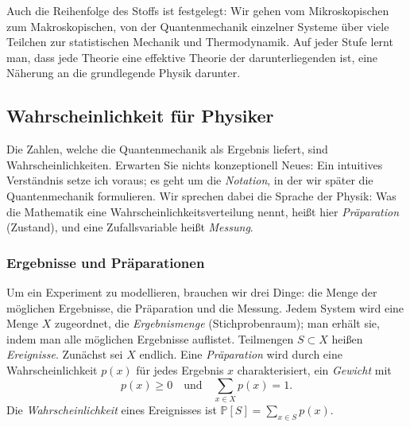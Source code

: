 Auch die Reihenfolge des Stoffs ist festgelegt: Wir gehen vom Mikroskopischen zum Makroskopischen, von der Quantenmechanik einzelner Systeme über viele Teilchen zur statistischen Mechanik und Thermodynamik. Auf jeder Stufe lernt man, dass jede Theorie eine effektive Theorie der darunterliegenden ist, eine Näherung an die grundlegende Physik darunter.


\subsection{Wahrscheinlichkeit für Physiker}
Die Zahlen, welche die Quantenmechanik als Ergebnis liefert, sind Wahrscheinlichkeiten. Erwarten Sie nichts konzeptionell Neues: Ein intuitives Verständnis setze ich voraus; es geht um die \emph{Notation}, in der wir später die Quantenmechanik formulieren. Wir sprechen dabei die Sprache der Physik: Was die Mathematik eine Wahrscheinlichkeitsverteilung nennt, heißt hier \emph{Präparation} (Zustand), und eine Zufallsvariable heißt \emph{Messung}.

\subsubsection{Ergebnisse und Präparationen}
Um ein Experiment zu modellieren, brauchen wir drei Dinge: die Menge der möglichen Ergebnisse, die Präparation und die Messung. Jedem System wird eine Menge $X$ zugeordnet, die \emph{Ergebnismenge} (Stichprobenraum); man erhält sie, indem man alle möglichen Ergebnisse auflistet. Teilmengen $S \subset X$ heißen \emph{Ereignisse}. Zunächst sei $X$ endlich. Eine \emph{Präparation} wird durch eine Wahrscheinlichkeit $p(x)$ für jedes Ergebnis $x$ charakterisiert, ein \emph{Gewicht} mit
\begin{equation}
	p(x) \geq 0 \quad \text{und} \quad \sum_{x \in X} p(x) = 1.
\end{equation}
Die \emph{Wahrscheinlichkeit} eines Ereignisses ist $\mathbb{P}[S] = \sum_{x \in S} p(x)$.


